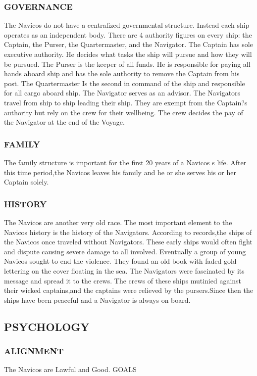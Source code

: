 \subsubsection{GOVERNANCE}
The Navicos do not have a centralized governmental structure.  Instead each ship operates as an independent body.  There are 4 authority figures on every ship: the Captain, the Purser, the Quartermaster, and the Navigator.  The Captain has sole executive authority.  He decides what tasks the ship will pursue and how they will be pursued.  The Purser is the keeper of all funds.  He is responsible for paying all hands aboard ship and has the sole authority to remove the Captain from his post.  The Quartermaster Is the second in command of the ship and responsible for all cargo aboard ship.  The Navigator serves as an advisor.  The Navigators travel from ship to ship leading their ship.  They are exempt from the Captain?s authority but rely on the crew for their wellbeing.  The crew decides the pay of the Navigator at the end of the Voyage.
\subsubsection{FAMILY}
The family structure is important for the first 20 years of a Navicos s life.  After this time period,the Navicos leaves his family and he or she serves his or her Captain solely.
\subsubsection{HISTORY}
The Navicos are another very old race.  The most important element to the Navicos history is the history of the Navigators.  According to records,the ships of the Navicos once traveled without Navigators.  These early ships would often fight and dispute causing severe damage to all involved.  Eventually a group of young Navicos sought to end the violence.  They found an old book with faded gold lettering on the cover floating in the sea.  The Navigators were fascinated by its message and spread it to the crews.  The crews of these ships mutinied against their wicked captains,and the captains were relieved by the pursers.Since then the ships have been peaceful and a Navigator is always on board.
\subsection{PSYCHOLOGY}
\subsubsection{ALIGNMENT}
The Navicos are Lawful and Good.
GOALS

